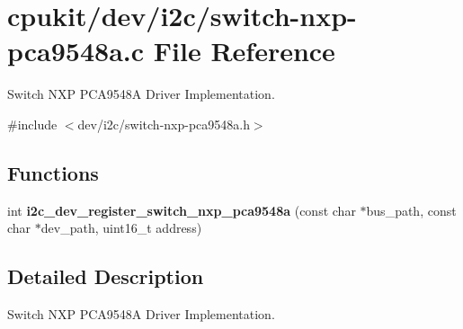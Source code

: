 \hypertarget{switch-nxp-pca9548a_8c}{}\section{cpukit/dev/i2c/switch-\/nxp-\/pca9548a.c File Reference}
\label{switch-nxp-pca9548a_8c}


Switch N\+XP P\+C\+A9548A Driver Implementation.  


{\ttfamily \#include $<$dev/i2c/switch-\/nxp-\/pca9548a.\+h$>$}\newline
\subsection*{Functions}
\begin{DoxyCompactItemize}
\item 
int {\bfseries i2c\+\_\+dev\+\_\+register\+\_\+switch\+\_\+nxp\+\_\+pca9548a} (const char $\ast$bus\+\_\+path, const char $\ast$dev\+\_\+path, uint16\+\_\+t address)
\end{DoxyCompactItemize}


\subsection{Detailed Description}
Switch N\+XP P\+C\+A9548A Driver Implementation. 

